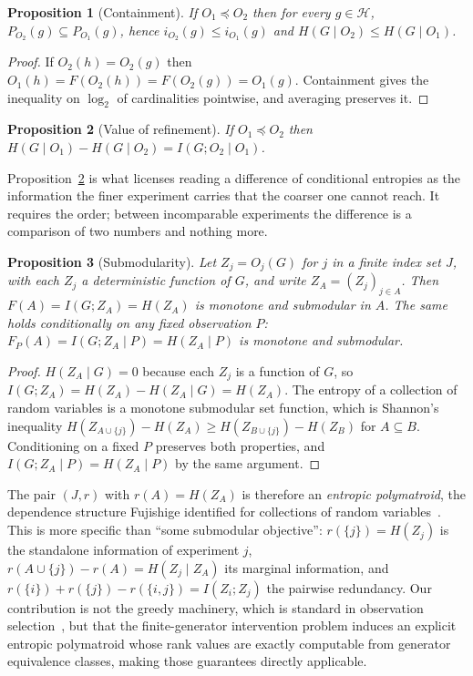 \documentclass[11pt]{article}
\newtheorem{proposition}{Proposition}
\newcommand{\HH}{\ensuremath{\mathcal{H}}}
\begin{document}
\begin{proposition}[Containment]\label{prop:contain}
If $O_1 \preceq O_2$ then for every $g \in \HH$,
$P_{O_2}(g) \subseteq P_{O_1}(g)$, hence $i_{O_2}(g) \le i_{O_1}(g)$ and
$H(G \mid O_2) \le H(G \mid O_1)$.
\end{proposition}
\begin{proof}
If $O_2(h) = O_2(g)$ then $O_1(h) = F(O_2(h)) = F(O_2(g)) = O_1(g)$. Containment gives the
inequality on $\log_2$ of cardinalities pointwise, and averaging preserves it.
\end{proof}

\begin{proposition}[Value of refinement]\label{prop:value}
If $O_1 \preceq O_2$ then
$H(G \mid O_1) - H(G \mid O_2) = I(G; O_2 \mid O_1)$.
\end{proposition}

Proposition~\ref{prop:value} is what licenses reading a difference of conditional
entropies as the information the finer experiment carries that the coarser one cannot
reach. It requires the order; between incomparable experiments the difference is a
comparison of two numbers and nothing more.

\begin{proposition}[Submodularity]\label{prop:submod}
Let $Z_j = O_j(G)$ for $j$ in a finite index set $J$, with each $Z_j$ a deterministic
function of $G$, and write $Z_A = (Z_j)_{j \in A}$. Then
$F(A) = I(G; Z_A) = H(Z_A)$ is monotone and submodular in $A$. The same holds
conditionally on any fixed observation $P$: $F_P(A) = I(G; Z_A \mid P) = H(Z_A \mid P)$
is monotone and submodular.
\end{proposition}
\begin{proof}
$H(Z_A \mid G) = 0$ because each $Z_j$ is a function of $G$, so
$I(G; Z_A) = H(Z_A) - H(Z_A \mid G) = H(Z_A)$. The entropy of a collection of random
variables is a monotone submodular set function, which is Shannon's inequality
$H(Z_{A \cup \{j\}}) - H(Z_A) \ge H(Z_{B \cup \{j\}}) - H(Z_B)$ for $A \subseteq B$.
Conditioning on a fixed $P$ preserves both properties, and
$I(G; Z_A \mid P) = H(Z_A \mid P)$ by the same argument.
\end{proof}

The pair $(J, r)$ with $r(A) = H(Z_A)$ is therefore an \emph{entropic polymatroid}, the
dependence structure Fujishige identified for collections of random
variables~\cite{fujishige1978}. This is more specific than ``some submodular objective'':
$r(\{j\}) = H(Z_j)$ is the standalone information of experiment $j$,
$r(A \cup \{j\}) - r(A) = H(Z_j \mid Z_A)$ its marginal information, and
$r(\{i\}) + r(\{j\}) - r(\{i,j\}) = I(Z_i; Z_j)$ the pairwise redundancy. Our contribution
is not the greedy machinery, which is standard in observation
selection~\cite{krause2005}, but that the finite-generator intervention problem induces an
explicit entropic polymatroid whose rank values are exactly computable from generator
equivalence classes, making those guarantees directly applicable.
\end{document}
